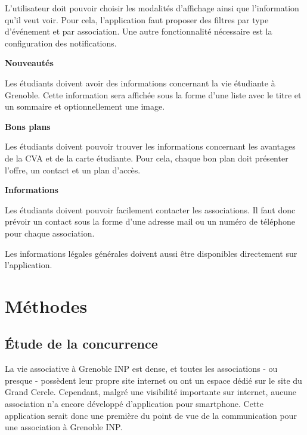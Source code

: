 \documentclass[a4paper, 11px]{article}
\begin{document}
L'utilisateur doit pouvoir choisir les modalités d'affichage ainsi que l'information qu'il veut voir. Pour cela, l'application faut proposer des filtres par type d'événement et par association. Une autre fonctionnalité nécessaire est la configuration des notifications.

\vspace{.3cm}

 \textbf {\large Nouveautés}

Les étudiants doivent avoir des informations concernant la vie étudiante à Grenoble. Cette information sera affichée sous la forme d'une liste avec le titre et un sommaire et optionnellement une image.

\vspace{.3cm}

 \textbf {\large Bons plans}

Les étudiants doivent pouvoir trouver les informations concernant les avantages de la CVA et de la carte étudiante. Pour cela, chaque bon plan doit présenter l'offre, un contact et un plan d'accès.

\vspace{.3cm}

 \textbf {\large Informations}

Les étudiants doivent pouvoir facilement contacter les associations. Il faut donc prévoir un contact sous la forme d'une adresse mail ou un numéro de téléphone pour chaque association.

Les informations légales générales doivent aussi être disponibles directement sur l'application.
\vspace{.3cm}

\newpage

\section{Méthodes}

\subsection{Étude de la concurrence}
La vie associative à Grenoble INP est dense, et toutes les associations - ou presque - possèdent leur propre site internet ou ont un espace dédié sur le site du Grand Cercle.
Cependant, malgré une visibilité importante sur internet, aucune association n'a encore développé d'application pour smartphone. Cette application serait donc une première du point de vue de la communication pour une association à Grenoble INP.
\end{document}
